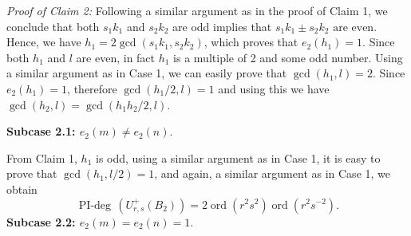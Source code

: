 \documentclass[12 pt,reqno]{amsart}
\numberwithin{equation}{section}
\DeclareMathOperator{\ord}{ord}
\theoremstyle{definition}
\theoremstyle{definition}
\theoremstyle{remark}
\theoremstyle{remark}
\begin{document}
\noindent\textit{Proof of Claim 2:} Following a similar argument as in the proof of Claim 1, we conclude that both $s_1k_1$ and $s_2k_2$ are odd implies that $s_1k_1 \pm s_2k_2 \text{ are even}.$ Hence, we have $h_1 = 2\gcd(s_1k_1, s_2k_2)$, which proves that $e_2(h_1)=1$. Since both $h_1$ and $l$ are even, in fact $h_1$ is a multiple of 2 and some odd number. Using a similar argument as in Case 1, we can easily prove that $\gcd(h_1,l)=2$. Since $e_2(h_1)=1$, therefore $\gcd(h_1/2,l)=1$ and using this we have $\gcd(h_2,l)=\gcd(h_1h_2/2,l)$.

\noindent\textbf{Subcase 2.1: $e_2(m) \neq e_2(n)$}.

\noindent From Claim 1, $h_1$ is odd, using a similar argument as in Case 1, it is easy to prove that $\gcd(h_1,l/2)=1$, and again, a similar argument as in Case 1, we obtain
$$
\operatorname{PI-deg}\, \left(U_{r,s}^+(B_2)\right) = 2  \ord(r^2s^2)  \ord(r^2s^{-2}).
$$
\noindent\textbf{Subcase 2.2: $e_2(m)= e_2(n)=1$}. 
\end{document}
